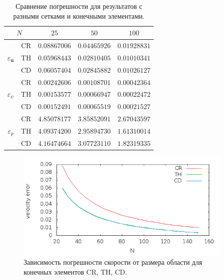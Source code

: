 \documentclass[12pt]{article}
\begin{document}
\begin{table}
    \begin{center}
	\begin{tabular}{|c|c|c|c|c|}
	    \hline	
	    \multicolumn{2}{|c|}{$N$} & $25$ & $50$ & $100$ \\
	    \hline
	    \multirow{3}{*}{$\varepsilon_{\bm u}$} & CR & $0.08867006$ & $0.04465926$ & $0.01928831$\\
	    
	     & TH & $0.05968443$ & $0.02810405$ & $0.01010341$\\

	     & CD & $0.06057404$ & $0.02845882$ & $0.01026127$\\
	    \hline
	    \multirow{3}{*}{$\varepsilon_{\psi}$} & CR & $0.00242606$ & $0.00108701$ & $0.00042364$\\
	    
	     & TH & $0.00153577$ & $0.00066947$ & $0.00022472$\\

	     & CD & $0.00152491$ & $0.00065519$ & $0.00021527$\\
	    \hline
	    \multirow{3}{*}{$\varepsilon_{p}$} & CR & $4.85078177$ & $3.85852091$ & $2.67043597$\\
	    
	     & TH & $4.09374200$ & $2.95894730$ & $1.61310014$\\

	     & CD & $4.16474664$ & $3.07723110$ & $1.82319335$\\
        \hline	    
	\end{tabular}	
	\caption{Сравнение погрешности для результатов с разными сетками и конечными элементами.}
	\label{tb:err}	 
	\end{center}
\end{table}	

\begin{figure}
	\begin{center}
		\includegraphics[width=400px]{pics/u_err}
		\caption{Зависимость погрешности скорости от размера области для конечных элементов CR, TH, CD.}
		\label{fg:u_err}
	\end{center}
\end{figure}
\end{document}

